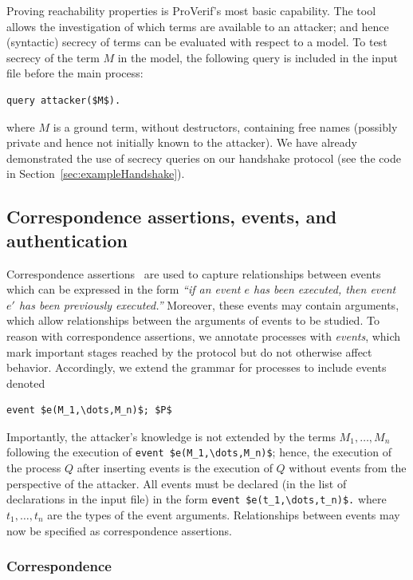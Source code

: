 \documentclass{book}
\begin{document}
Proving reachability properties is ProVerif's most basic capability.
The tool allows the investigation of which terms are available
to an attacker; and hence (syntactic) secrecy of terms can be evaluated with respect to a model.
To test secrecy of the term $M$ in the model, the following query is
included in the input file before the main process:
\begin{lstlisting}[numbers=none]
	query attacker($M$).
\end{lstlisting}
where $M$ is a ground term, without destructors, containing free names (possibly private and hence not initially known to the attacker). We have already demonstrated the use of secrecy queries on our handshake protocol (see the code in Section~\ref{sec:exampleHandshake}).



\subsection{Correspondence assertions, events, and authentication}\label{sec:correspondence}

Correspondence assertions~\cite{Woo93} are used to capture relationships between events which
can be expressed in the form \emph{``if an event $e$ has been executed, then event
$e'$ has been previously executed.''} Moreover, these events may contain
arguments, which allow relationships between the arguments of events to be
studied. To reason with correspondence assertions,
we annotate processes with \emph{events}, which mark important stages
reached by the protocol but do not otherwise affect behavior.
Accordingly, we extend the grammar for processes to include events denoted
\begin{lstlisting}[numbers=none]
	event $e(M_1,\dots,M_n)$; $P$
\end{lstlisting}
Importantly, the attacker's knowledge is not extended by the terms $M_1,\dots,M_n$ following the
execution of \lstinline!event $e(M_1,\dots,M_n)$!; hence, the execution of the process $Q$
after inserting events is the execution of $Q$ without events from the perspective of the attacker.
All events must be declared (in the list of declarations in the input file) in the form \lstinline!event $e(t_1,\dots,t_n)$.! where $t_1,\ldots,t_n$ are the types of the event arguments.
Relationships between events may now be specified as correspondence assertions.


\subsubsection{Correspondence}
\end{document}
